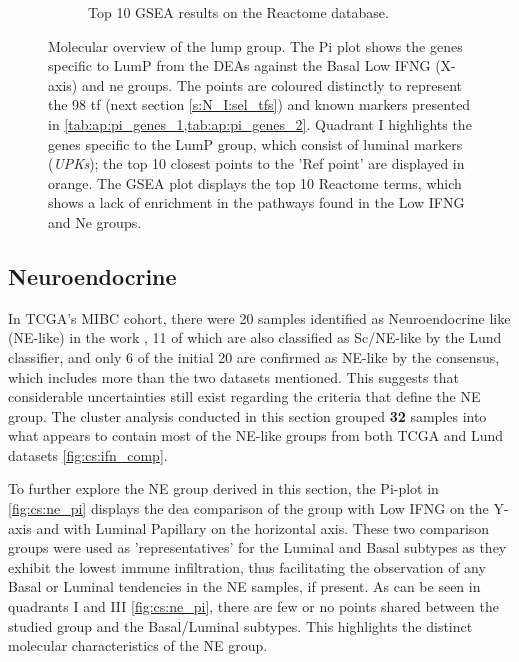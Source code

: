 \begin{figure}[H]
\begin{subfigure}[!t]{0.83\textwidth}
        \caption{Top 10 GSEA results on the Reactome database.}
        \label{fig:cs:lumP_gsea}
    \end{subfigure} 
    \centering
    \caption[LumP like - molecular overview]{Molecular overview of the \acrfull{lump} group. The Pi plot shows the genes specific to LumP from the DEAs against the Basal Low IFNG (X-axis) and \acrlong{ne} groups. The points are coloured distinctly to represent the 98 \acrlong{tf} (next section \cref{s:N_I:sel_tfs}) and known markers presented in \cref{tab:ap:pi_genes_1,tab:ap:pi_genes_2}. Quadrant I highlights the genes specific to the LumP group, which consist of luminal markers (\textit{UPKs}); the top 10 closest points to the 'Ref point' are displayed in orange. The GSEA plot displays the top 10 Reactome terms, which shows a lack of enrichment in the pathways found in the Low IFNG and Ne groups.}
    \label{fig:cs:lump}
\end{figure}


\subsection{Neuroendocrine} \label{s:cs:ne_interp}


In TCGA's MIBC cohort, there were 20 samples identified as Neuroendocrine like (NE-like) in the work \citet{Robertson2017-mg}, 11 of which are also classified as Sc/NE-like by the Lund classifier, and only 6 of the initial 20 are confirmed as NE-like by the consensus, which includes more than the two datasets mentioned. This suggests that considerable uncertainties still exist regarding the criteria that define the NE group. The cluster analysis conducted in this section grouped \textbf{32} samples into what appears to contain most of the NE-like groups from both TCGA and Lund datasets \cref{fig:cs:ifn_comp}.

To further explore the NE group derived in this section, the Pi-plot in \cref{fig:cs:ne_pi} displays the \acrshort{dea} comparison of the group with Low IFNG on the Y-axis and with Luminal Papillary on the horizontal axis. These two comparison groups were used as 'representatives' for the Luminal and Basal subtypes as they exhibit the lowest immune infiltration, thus facilitating the observation of any Basal or Luminal tendencies in the NE samples, if present. As can be seen in quadrants I and III \cref{fig:cs:ne_pi}, there are few or no points shared between the studied group and the Basal/Luminal subtypes. This highlights the distinct molecular characteristics of the NE group.



